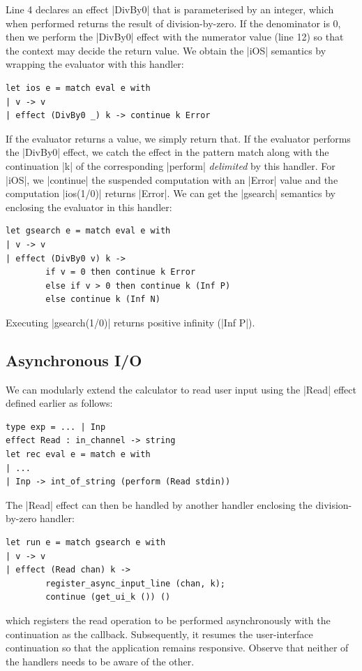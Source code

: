 \documentclass[sigplan,10pt,review,anonymous]{acmart}\settopmatter{printfolios=true,printccs=false,printacmref=false}
\begin{document}
Line 4 declares an effect |DivBy0| that is parameterised by an integer,
which when performed returns the result of division-by-zero. If the denominator
is 0, then we perform the |DivBy0| effect with the numerator value (line 12) so that
the context may decide the return value. We obtain the |iOS| semantics by
wrapping the evaluator with this handler:
\begin{lstlisting}
let ios e = match eval e with
| v -> v
| effect (DivBy0 _) k -> continue k Error
\end{lstlisting}
If the evaluator returns a value, we simply return that. If the evaluator
performs the |DivBy0| effect, we catch the effect in the pattern match along with
the continuation |k| of the corresponding |perform| \emph{delimited} by this
handler. For |iOS|, we |continue| the suspended computation with an
|Error| value and the computation |ios(1/0)| returns |Error|.
We can get the |gsearch| semantics by enclosing the evaluator in this handler:
\begin{lstlisting}
let gsearch e = match eval e with
| v -> v
| effect (DivBy0 v) k ->
		if v = 0 then continue k Error
		else if v > 0 then continue k (Inf P)
		else continue k (Inf N)
\end{lstlisting}
Executing |gsearch(1/0)| returns positive infinity (|Inf P|).

\subsection{Asynchronous I/O}
\label{sec:aio}

We can modularly extend the calculator to read user input using the |Read|
effect defined earlier as follows:
\begin{lstlisting}
type exp = ... | Inp
effect Read : in_channel -> string
let rec eval e = match e with
| ...
| Inp -> int_of_string (perform (Read stdin))
\end{lstlisting}
The |Read| effect can then be handled by another handler enclosing the
division-by-zero handler:
\begin{lstlisting}
let run e = match gsearch e with
| v -> v
| effect (Read chan) k ->
		register_async_input_line (chan, k);
		continue (get_ui_k ()) ()
\end{lstlisting}
\noindent which registers the read operation to be performed asynchronously
with the continuation as the callback. Subsequently, it resumes the
user-interface continuation so that the application remains responsive. Observe
that neither of the handlers needs to be aware of the other.
\end{document}
